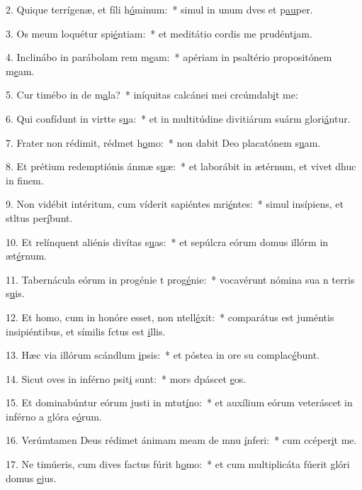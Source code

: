 2. Quique terrígenæ, et fíli h\uline{ó}minum:~* simul in unum dves et p\uline{au}per.\par 
3. Os meum loquétur spi\uline{é}ntiam:~* et meditátio cordis me prudént\uline{i}am.\par 
4. Inclinábo in parábolam rem m\uline{e}am:~* apériam in psaltério propositónem m\uline{e}am.\par 
5. Cur timébo in de m\uline{a}la?~* iníquitas calcánei mei crcúmdab\uline{i}t me:\par 
6. Qui confídunt in virtte s\uline{u}a:~* et in multitúdine divitiárum suárm glori\uline{á}ntur.\par 
7. Frater non rédimit, rédmet h\uline{o}mo:~* non dabit Deo placatónem s\uline{u}am.\par 
8. Et prétium redemptiónis ánmæ s\uline{u}æ:~* et laborábit in ætérnum, et vivet dhuc in f\uline{i}nem.\par 
9. Non vidébit intéritum, cum víderit sapiéntes mri\uline{é}ntes:~* simul insípiens, et stltus per\uline{í}bunt.\par 
10. Et relínquent aliénis divítas s\uline{u}as:~* et sepúlcra eórum domus illórm in æt\uline{é}rnum.\par 
11. Tabernácula eórum in progénie t prog\uline{é}nie:~* vocavérunt nómina sua n terris s\uline{u}is.\par 
12. Et homo, cum in honóre esset, non ntell\uline{é}xit:~* comparátus est juméntis insipiéntibus, et símilis fctus est \uline{i}llis.\par 
13. Hæc via illórum scándlum \uline{i}psis:~* et póstea in ore su complac\uline{é}bunt.\par 
14. Sicut oves in inférno psit\uline{i} sunt:~* mors dpáscet \uline{e}os.\par 
15. Et dominabúntur eórum justi in mtut\uline{í}no:~* et auxílium eórum veteráscet in inférno a glóra e\uline{ó}rum.\par 
16. Verúmtamen Deus rédimet ánimam meam de mnu \uline{í}nferi:~* cum ccéper\uline{i}t me.\par 
17. Ne timúeris, cum dives factus fúrit h\uline{o}mo:~* et cum multiplicáta fúerit glóri domus \uline{e}jus.\par 
